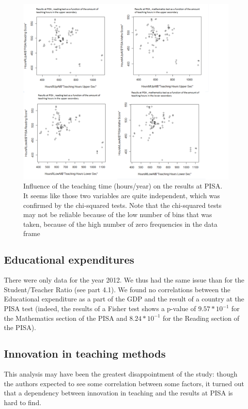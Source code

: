 \documentclass[12pt,a4paper]{article}
\begin{document}
\begin{figure}
	\centering
	\label{STRatio}
	\caption{Influence of the teaching time (hours/year) on the results at PISA. It seems like those two variables are quite independent, which was confirmed by the chi-squared tests. Note that the chi-squared tests may not be reliable because of the low number of bins that was taken, because of the high number of zero frequencies in the data frame}
	\includegraphics[scale=0.4]{img/TeachingHours.png}
\end{figure}

\subsection{Educational expenditures}

There were only data for the year 2012. We thus had the same issue than for the Student/Teacher Ratio (see part 4.1). We found no correlations between the Educational expenditure as a part of the GDP and the result of a country at the PISA test (indeed, the results of a Fisher test shows a p-value of $9.57*10^{-1}$ for the Mathematics section of the PISA and $8.24*10^{-1}$ for the Reading section of the PISA).

\subsection{Innovation in teaching methods}

This analysis may have been the greatest disappointment of the study: though the authors expected to see some correlation between some factors, it turned out that a dependency between innovation in teaching and the results at PISA is hard to find.
\end{document}

